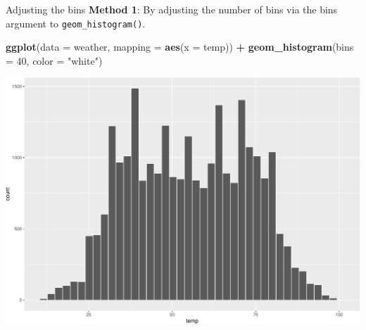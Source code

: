 \documentclass[
  ignorenonframetext,
]{beamer}
\newenvironment{Shaded}{\begin{snugshade}}{\end{snugshade}}
\newcommand{\AttributeTok}[1]{\textcolor[rgb]{0.13,0.29,0.53}{#1}}
\newcommand{\DecValTok}[1]{\textcolor[rgb]{0.00,0.00,0.81}{#1}}
\newcommand{\FunctionTok}[1]{\textcolor[rgb]{0.13,0.29,0.53}{\textbf{#1}}}
\newcommand{\NormalTok}[1]{#1}
\newcommand{\SpecialCharTok}[1]{\textcolor[rgb]{0.81,0.36,0.00}{\textbf{#1}}}
\newcommand{\StringTok}[1]{\textcolor[rgb]{0.31,0.60,0.02}{#1}}
\begin{document}
\begin{frame}[fragile]{Adjusting the bins}
\protect\hypertarget{adjusting-the-bins}{}
\textbf{Method 1}: By adjusting the number of bins via the bins argument
to \texttt{geom\_histogram()}.

\tiny

\begin{Shaded}
\begin{Highlighting}[]
\FunctionTok{ggplot}\NormalTok{(}\AttributeTok{data =}\NormalTok{ weather, }\AttributeTok{mapping =} \FunctionTok{aes}\NormalTok{(}\AttributeTok{x =}\NormalTok{ temp)) }\SpecialCharTok{+}
  \FunctionTok{geom\_histogram}\NormalTok{(}\AttributeTok{bins =} \DecValTok{40}\NormalTok{, }\AttributeTok{color =} \StringTok{"white"}\NormalTok{)}
\end{Highlighting}
\end{Shaded}

\begin{center}\includegraphics[width=0.7\linewidth,height=0.5\textheight]{Week2_files/figure-beamer/unnamed-chunk-29-1} \end{center}
\normalsize
\end{frame}
\end{document}
